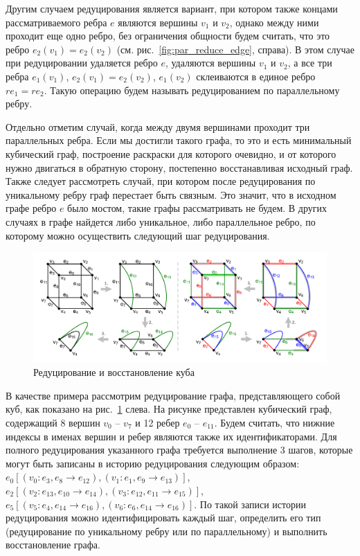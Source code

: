 Другим случаем редуцирования является вариант, при котором также концами рассматриваемого ребра $e$ являются вершины $v_1$ и $v_2$, однако между ними проходит еще одно ребро, без ограничения общности будем считать, что это ребро $e_2(v_1) = e_2(v_2)$ (см. рис.~\ref{fig:par_reduce_edge}, справа).
В этом случае при редуцировании удаляется ребро $e$, удаляются вершины $v_1$ и $v_2$, а все три ребра $e_1(v_1)$, $e_2(v_1) = e_2(v_2)$, $e_1(v_2)$ склеиваются в единое ребро $re_1 = re_2$.
Такую операцию будем называть редуцированием по параллельному ребру.

Отдельно отметим случай, когда между двумя вершинами проходит три параллельных ребра.
Если мы достигли такого графа, то это и есть минимальный кубический граф, построение раскраски для которого очевидно, и от которого нужно двигаться в обратную сторону, постепенно восстанавливая исходный граф.
Также следует рассмотреть случай, при котором после редуцирования по уникальному ребру граф перестает быть связным.
Это значит, что в исходном графе ребро $e$ было мостом, такие графы рассматривать не будем.
В других случаях в графе найдется либо уникальное, либо параллельное ребро, по которому можно осуществить следующий шаг редуцирования.

\begin{figure}[ht]
\centering
\includegraphics[width=1.0\textwidth]{fig/par_edge_col_3_reduce_cube.pdf}
\singlespacing
{}\caption{Редуцирование и восстановление куба}
\label{fig:par_edge_col_3_reduce_cube}
\end{figure}

В качестве примера рассмотрим редуцирование графа, представляющего собой куб, как показано на рис.~\ref{fig:par_edge_col_3_reduce_cube} слева.
На рисунке представлен кубический граф, содержащий 8 вершин $v_0$ -- $v_7$ и 12 ребер $e_0$ -- $e_{11}$.
Будем считать, что нижние индексы в именах вершин и ребер являются также их идентификаторами.
Для полного редуцирования указанного графа требуется выполнение 3 шагов, которые могут быть записаны в историю редуцирования следующим образом: $e_0 [(v_0 : e_3, e_8 \rightarrow e_{12}), (v_1 : e_1, e_9 \rightarrow e_{13})]$, $e_2 [(v_2 : e_{13}, e_{10} \rightarrow e_{14}), (v_3 : e_{12}, e_{11} \rightarrow e_{15})]$, $e_5 [(v_5 : e_4, e_{14} \rightarrow e_{16}), (v_6 : e_6, e_{14} \rightarrow e_{16})]$.
По такой записи истории редуцирования можно идентифицировать каждый шаг, определить его тип (редуцирование по уникальному ребру или по параллельному) и выполнить восстановление графа.

